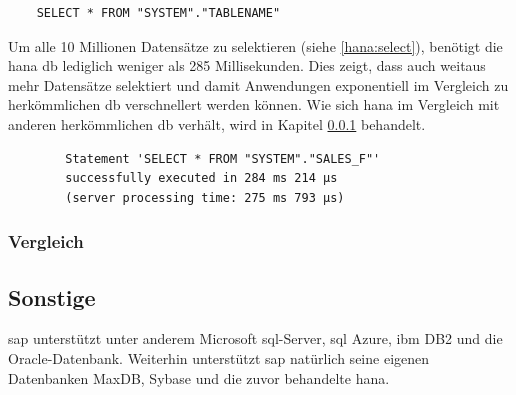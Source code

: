 \begin{lstlisting}
	SELECT * FROM "SYSTEM"."TABLENAME"
\end{lstlisting}

Um alle 10 Millionen Datensätze zu selektieren (siehe \ref{hana:select}), benötigt die \gls{hana} \gls{db} lediglich weniger als 285 Millisekunden. Dies zeigt, dass auch weitaus mehr Datensätze selektiert und damit Anwendungen exponentiell im Vergleich zu herkömmlichen \gls{db} verschnellert werden können. Wie sich \gls{hana} im Vergleich mit anderen herkömmlichen \gls{db} verhält, wird in Kapitel \ref{sec:db-hana-vgl} behandelt.

\begin{center}
	\begin{verbatim}
		Statement 'SELECT * FROM "SYSTEM"."SALES_F"' 
		successfully executed in 284 ms 214 µs  
		(server processing time: 275 ms 793 µs)
	\end{verbatim}
\end{center}

\subsubsection{Vergleich}
\label{sec:db-hana-vgl}

\subsection{Sonstige}
\label{sec:db-sonstige}
\gls{sap} unterstützt unter anderem Microsoft \gls{sql}-Server, \gls{sql} Azure, \gls{ibm} DB2 und die Oracle-Datenbank. Weiterhin unterstützt \gls{sap} natürlich seine eigenen Datenbanken MaxDB, Sybase und die zuvor behandelte \gls{hana}.